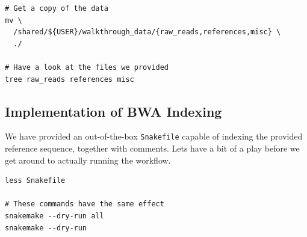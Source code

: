 \begin{lstlisting}
# Get a copy of the data
mv \
  /shared/${USER}/walkthrough_data/{raw_reads,references,misc} \
  ./

# Have a look at the files we provided
tree raw_reads references misc
\end{lstlisting}

\subsection{Implementation of BWA Indexing}

We have provided an out-of-the-box \texttt{Snakefile} capable of indexing the provided reference sequence, together with comments.
Lets have a bit of a play before we get around to actually running the workflow.

\begin{lstlisting}
less Snakefile

# These commands have the same effect
snakemake --dry-run all
snakemake --dry-run
\end{lstlisting}


